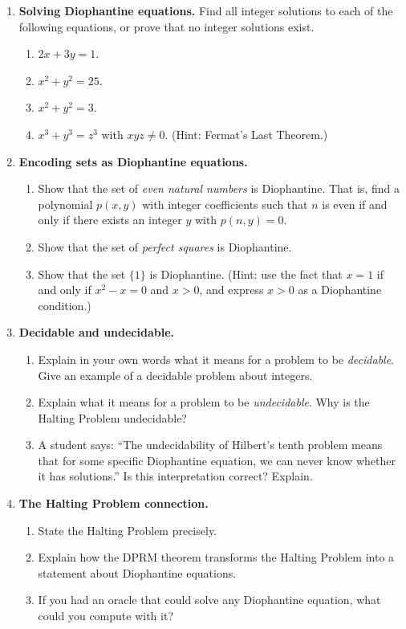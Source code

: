 \begin{enumerate}

    \item \textbf{Solving Diophantine equations.} Find all integer solutions to each of the following equations, or prove that no integer solutions exist.
    \begin{enumerate}
        \item $2x + 3y = 1$.
        \item $x^2 + y^2 = 25$.
        \item $x^2 + y^2 = 3$.
        \item $x^3 + y^3 = z^3$ with $xyz \neq 0$. (Hint: Fermat's Last Theorem.)
    \end{enumerate}

    \item \textbf{Encoding sets as Diophantine equations.}
    \begin{enumerate}
        \item Show that the set of \emph{even natural numbers} is Diophantine. That is, find a polynomial $p(x, y)$ with integer coefficients such that $n$ is even if and only if there exists an integer $y$ with $p(n, y) = 0$.
        \item Show that the set of \emph{perfect squares} is Diophantine.
        \item Show that the set $\{1\}$ is Diophantine. (Hint: use the fact that $x = 1$ if and only if $x^2 - x = 0$ and $x > 0$, and express $x > 0$ as a Diophantine condition.)
    \end{enumerate}

    \item \textbf{Decidable and undecidable.}
    \begin{enumerate}
        \item Explain in your own words what it means for a problem to be \emph{decidable}. Give an example of a decidable problem about integers.
        \item Explain what it means for a problem to be \emph{undecidable}. Why is the Halting Problem undecidable?
        \item A student says: ``The undecidability of Hilbert's tenth problem means that for some specific Diophantine equation, we can never know whether it has solutions.'' Is this interpretation correct? Explain.
    \end{enumerate}

    \item \textbf{The Halting Problem connection.}
    \begin{enumerate}
        \item State the Halting Problem precisely.
        \item Explain how the DPRM theorem transforms the Halting Problem into a statement about Diophantine equations.
        \item If you had an oracle that could solve any Diophantine equation, what could you compute with it?
    \end{enumerate}


\end{enumerate}

